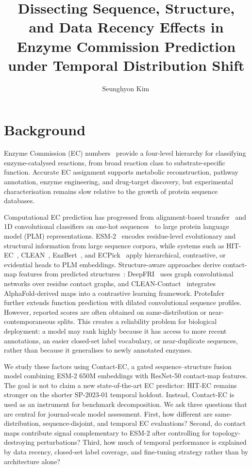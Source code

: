 \documentclass[numbered,contemporary,mediumone]{oup-authoring-template}
\title[Temporal EC Prediction]{Dissecting Sequence, Structure, and Data Recency Effects
in Enzyme Commission Prediction under Temporal Distribution Shift}
\author[1,$\ast$]{Seunghyon Kim\,\ORCID{0009-0002-0708-748X}}
\begin{document}
\maketitle
\thispagestyle{plain}
\pagestyle{plain}
\linenumbers

\section{Background}

Enzyme Commission (EC) numbers~\citep{mcdonald2023} provide a four-level hierarchy
for classifying enzyme-catalysed reactions, from broad reaction class to
substrate-specific function. Accurate EC assignment supports metabolic
reconstruction, pathway annotation, enzyme engineering, and drug-target
discovery, but experimental characterisation remains slow relative to the
growth of protein sequence databases.

Computational EC prediction has progressed from alignment-based
transfer~\citep{altschul1990} and 1D convolutional classifiers on one-hot
sequences~\citep{ryu2019,dalkiran2018} to large protein language model (PLM)
representations. ESM-2~\citep{lin2023} encodes residue-level evolutionary and
structural information from large sequence corpora, while systems such as
HIT-EC~\citep{dumontet2026}, CLEAN~\citep{yu2023}, EnzBert~\citep{buton2023},
and ECPick~\citep{han2024} apply hierarchical, contrastive, or evidential heads
to PLM embeddings. Structure-aware approaches derive contact-map features from
predicted structures~\citep{jumper2021,varadi2022}: DeepFRI~\citep{gligorijevic2021}
uses graph convolutional networks over residue contact graphs, and
CLEAN-Contact~\citep{ayres2024} integrates AlphaFold-derived maps into a
contrastive learning framework. ProteInfer~\citep{sanderson2023} further extends
function prediction with dilated convolutional sequence profiles. However,
reported scores are often obtained on same-distribution or near-contemporaneous
splits. This creates a reliability problem for biological deployment: a model
may rank highly because it has access to more recent annotations, an easier
closed-set label vocabulary, or near-duplicate sequences, rather than because
it generalises to newly annotated enzymes.

We study these factors using Contact-EC, a gated sequence--structure fusion model
combining ESM-2 650M embeddings with ResNet-50 contact-map features. The goal is
not to claim a new state-of-the-art EC predictor: HIT-EC remains stronger on the
shorter SP-2023-01 temporal holdout. Instead, Contact-EC is used as an instrument for benchmark
decomposition. We ask three questions that are central for journal-scale
model assessment. First, how different are same-distribution, sequence-disjoint,
and temporal EC evaluations? Second, do contact maps contribute signal
complementary to ESM-2 after controlling for topology-destroying perturbations?
Third, how much of temporal performance is explained by data recency,
closed-set label coverage, and fine-tuning strategy rather than by architecture alone?
\end{document}
